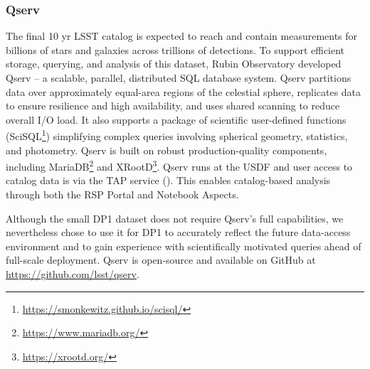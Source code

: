 \subsubsection{Qserv}
\label{sssec:qserv}
The final 10 yr \gls{LSST} catalog is expected to reach \tenyearcatalogsize and contain measurements for billions of stars and galaxies across trillions of detections.
To support efficient storage, querying, and analysis of this dataset,  Rubin Observatory developed Qserv \citep[][]{Wang:2011:QDS:2063348.2063364, 2025ASPC..538..114M} -- a scalable, parallel, distributed SQL database system.
\gls{Qserv} partitions data over approximately equal-area regions of the celestial sphere, replicates data to ensure resilience and high availability, and uses shared scanning to reduce overall I/O load.
It also supports a package of scientific user-defined functions (SciSQL\footnote{\url{https://smonkewitz.github.io/scisql/}}) simplifying complex queries involving spherical geometry, statistics, and photometry.
\gls{Qserv} is built on robust production-quality components, including MariaDB\footnote{\url{https://www.mariadb.org/}} and XRootD\footnote{\url{https://xrootd.org/}}.
Qserv runs at the \gls{USDF} and user access to catalog data is via the TAP service ().
This enables catalog-based analysis through both the \gls{RSP} Portal and Notebook Aspects.

Although the small \gls{DP1} dataset does not require Qserv’s full capabilities, we nevertheless chose to use it for \gls{DP1} to accurately reflect the future data-access environment and to gain experience with scientifically motivated queries ahead of full-scale deployment.
\gls{Qserv} is open-source and available on GitHub at \url{https://github.com/lsst/qserv}.

